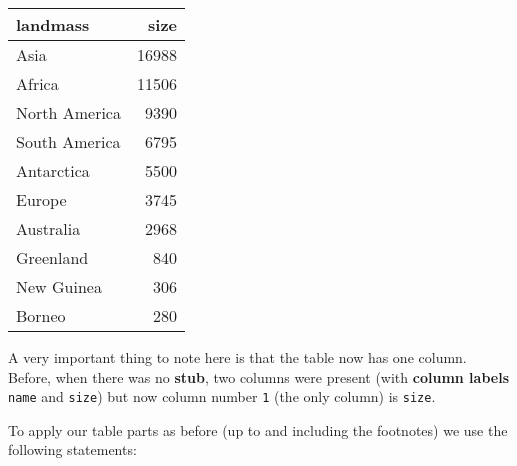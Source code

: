 \documentclass[]{article}
\newenvironment{Shaded}{\begin{snugshade}}{\end{snugshade}}
\newcommand{\KeywordTok}[1]{\textcolor[rgb]{0.13,0.29,0.53}{\textbf{#1}}}
\newcommand{\DataTypeTok}[1]{\textcolor[rgb]{0.13,0.29,0.53}{#1}}
\newcommand{\StringTok}[1]{\textcolor[rgb]{0.31,0.60,0.02}{#1}}
\newcommand{\CommentTok}[1]{\textcolor[rgb]{0.56,0.35,0.01}{\textit{#1}}}
\newcommand{\OperatorTok}[1]{\textcolor[rgb]{0.81,0.36,0.00}{\textbf{#1}}}
\newcommand{\NormalTok}[1]{#1}
\begin{document}
\begin{Shaded}
\end{Shaded}

\captionsetup[table]{labelformat=empty,skip=1pt}

\begin{longtable}{lr}
\toprule
landmass & size \\ 
\midrule
Asia & 16988 \\ 
Africa & 11506 \\ 
North America & 9390 \\ 
South America & 6795 \\ 
Antarctica & 5500 \\ 
Europe & 3745 \\ 
Australia & 2968 \\ 
Greenland & 840 \\ 
New Guinea & 306 \\ 
Borneo & 280 \\ 
\bottomrule
\end{longtable}

A very important thing to note here is that the table now has one
column. Before, when there was no \textbf{stub}, two columns were
present (with \textbf{column labels} \texttt{name} and \texttt{size})
but now column number \texttt{1} (the only column) is \texttt{size}.

To apply our table parts as before (up to and including the footnotes)
we use the following statements:
\end{document}
